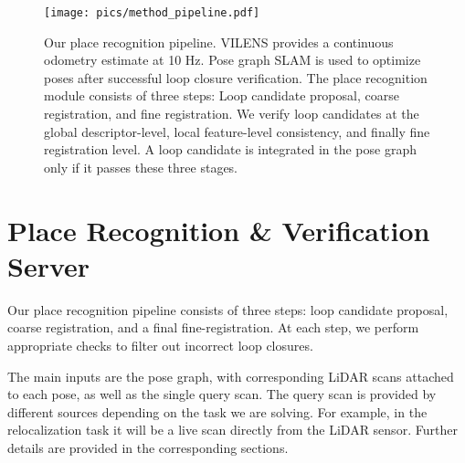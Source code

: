 

\begin{figure}[t]
  \centering
  \texttt{[image: pics/method\_pipeline.pdf]}
  \caption{Our place recognition pipeline. VILENS provides a continuous odometry estimate at 10 Hz. Pose graph SLAM is used to optimize poses after successful loop closure verification. 
  The place recognition module consists of three steps: Loop candidate proposal, coarse registration, and fine registration. We verify loop candidates
  at the global descriptor-level, local feature-level consistency, and finally fine registration level. A loop candidate is integrated in the pose graph only if it passes these three stages.}
  \label{fig:pipeline}
\end{figure}


\section{Place Recognition \& Verification Server} \label{sec:pipeline}
Our place recognition pipeline consists of three steps: loop candidate proposal, coarse registration, and a final fine-registration. At each step, we perform appropriate checks to filter out incorrect loop closures.

The main inputs are the pose graph, with corresponding LiDAR scans attached to each pose, as well as the single query scan. The query scan is provided by different sources depending on the task we are solving. For example, in the relocalization task it will be a live scan directly from the LiDAR sensor. Further details are provided in the corresponding sections.

